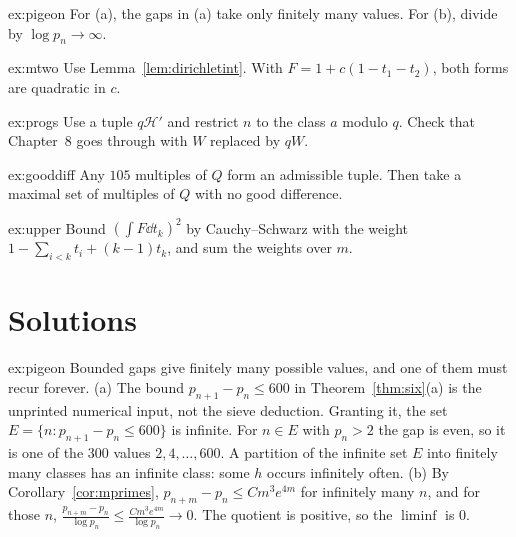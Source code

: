 \begin{hint}{ex:pigeon}
For (a), the gaps in (a) take only finitely many values. For (b), divide by $\log p_n\to\infty$.
\end{hint}

\begin{hint}{ex:mtwo}
Use Lemma~\ref{lem:dirichletint}. With $F=1+c(1-t_1-t_2)$, both forms are quadratic in $c$.
\end{hint}

\begin{hint}{ex:progs}
Use a tuple $q\mathcal H'$ and restrict $n$ to the class $a$ modulo $q$. Check that Chapter~8 goes through with $W$ replaced by $qW$.
\end{hint}

\begin{hint}{ex:gooddiff}
Any $105$ multiples of $Q$ form an admissible tuple. Then take a maximal set of multiples of $Q$ with no good difference.
\end{hint}

\begin{hint}{ex:upper}
Bound $(\int F\dd t_k)^2$ by Cauchy--Schwarz with the weight $1-\sum_{i<k}t_i+(k-1)t_k$, and sum the weights over $m$.
\end{hint}

\section{Solutions}

\begin{solution}{ex:pigeon}
\idea Bounded gaps give finitely many possible values, and one of them must recur forever.
\writeup (a) The bound $p_{n+1}-p_n\le600$ in Theorem~\ref{thm:six}(a) is the unprinted numerical input, not the sieve deduction. Granting it, the set $E=\{n:p_{n+1}-p_n\le600\}$ is infinite. For $n\in E$ with $p_n>2$ the gap is even, so it is one of the $300$ values $2,4,\dots,600$. A partition of the infinite set $E$ into finitely many classes has an infinite class: some $h$ occurs infinitely often.
(b) By Corollary~\ref{cor:mprimes}, $p_{n+m}-p_n\le Cm^3e^{4m}$ for infinitely many $n$, and for those $n$, $\frac{p_{n+m}-p_n}{\log p_n}\le\frac{Cm^3e^{4m}}{\log p_n}\to0$. The quotient is positive, so the $\liminf$ is $0$.
\end{solution}

